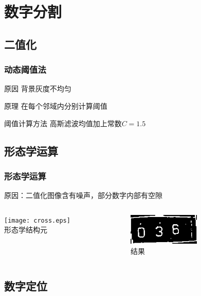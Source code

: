 \documentclass[12pt,hyperref={CJKbookmarks=true}]{beamer}
\begin{document}
\section{数字分割}

\subsection{二值化}

\begin{frame}
  \frametitle{动态阈值法}
  \begin{block}{原因}
    背景灰度不均匀
  \end{block}
  \begin{block}{原理}
    在每个邻域内分别计算阈值
  \end{block}
  \begin{block}{阈值计算方法}
    高斯滤波均值加上常数$C=1.5$
  \end{block}
\end{frame}

\subsection{形态学运算}


\begin{frame}
  \frametitle{形态学运算}
  \begin{center}
    原因：二值化图像含有噪声，部分数字内部有空隙
  \end{center}
  \begin{columns}[onlytextwidth]
    \begin{column}{0.5\textwidth}
      \centering\texttt{[image: cross.eps]}\\
      \footnotesize 形态学结构元
    \end{column}
    \begin{column}{0.5\textwidth}
      \centering
      \includegraphics[width=0.5\textwidth]{framebin.png}\\
      \footnotesize 结果
    \end{column}
  \end{columns}
\end{frame}

\subsection{数字定位}
\end{document}
